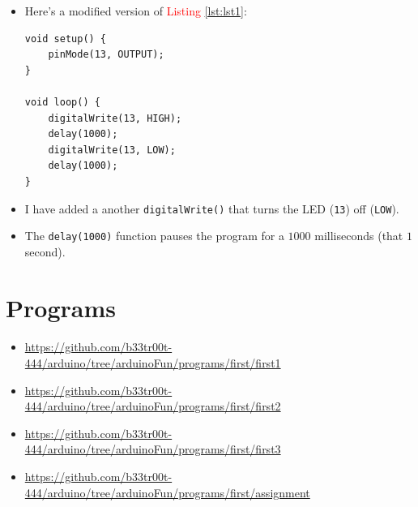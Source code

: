 \documentclass{article}
\begin{document}
\begin{itemize}
	\newpage
	
	\item Here's a modified version of \textcolor{Red}{Listing \ref{lst:lst1}}:
	
	\begin{lstlisting}[frame=TlbR, caption=Blinking LED, label=lst:lst2]
void setup() {
	pinMode(13, OUTPUT);
}

void loop() {
	digitalWrite(13, HIGH);
	delay(1000);
	digitalWrite(13, LOW);
	delay(1000);
}

	\end{lstlisting}
	
	\item I have added a another \lstinline|digitalWrite()| that turns the LED (\lstinline|13|) off (\lstinline|LOW|).
	
	\item The \lstinline|delay(1000)| function pauses the program for a $1000$ milliseconds (that $1$ second).
\end{itemize}

\pagebreak

\section{Programs}
\paragraph{}

\begin{itemize}
	\item \url{https://github.com/b33tr00t-444/arduino/tree/arduinoFun/programs/first/first1}
	\item \url{https://github.com/b33tr00t-444/arduino/tree/arduinoFun/programs/first/first2}
	\item \url{https://github.com/b33tr00t-444/arduino/tree/arduinoFun/programs/first/first3}
	\item \url{https://github.com/b33tr00t-444/arduino/tree/arduinoFun/programs/first/assignment}
\end{itemize}
\end{document}
